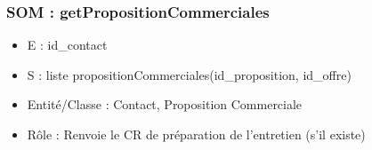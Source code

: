 \subsubsection{SOM : getPropositionCommerciales}
	\begin{itemize}
		\item E : id\_contact
		\item S : liste propositionCommerciales(id\_proposition, id\_offre)
		\item Entité/Classe : Contact, Proposition Commerciale
		\item Rôle : Renvoie le CR de préparation de l’entretien (s’il existe)
	\end{itemize}
